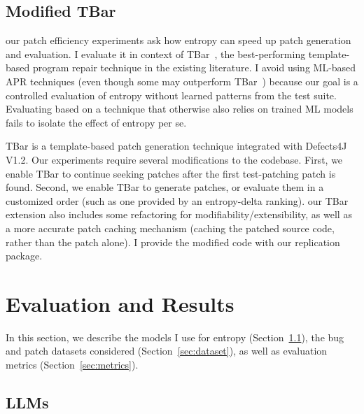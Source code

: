 \documentclass[12pt,openany,oneside,table]{cmuthesis}
\begin{document}
\subsection{Modified TBar}
\label{sec:entropy-tbar}

our patch efficiency experiments ask how entropy can speed up patch generation
and evaluation.  I evaluate it in context of TBar~\cite{TBar}, the best-performing
template-based program repair technique in the existing literature.  I avoid
using ML-based APR techniques (even though some may outperform TBar~\cite{xia2023automated, TransferFL, Dear}) because our goal is a controlled evaluation of entropy without learned patterns from the test suite.  Evaluating based on a technique that otherwise also relies on trained ML
models fails to isolate the effect of entropy per se.

TBar is a template-based patch generation technique
integrated with Defects4J V1.2. Our experiments require several modifications to the
codebase.  First, we enable TBar to continue seeking patches after the first
test-patching patch is found.  Second, we enable TBar to generate patches, or
evaluate them in a customized order (such as one provided by an entropy-delta ranking).
our TBar extension also includes some refactoring for
modifiability/extensibility, as well as a more accurate patch caching mechanism
(caching the patched source code, rather than the patch alone).  I provide the
modified code with our replication package.


\section{Evaluation and Results}

In this section, we describe the models I use for entropy
(Section~\ref{sec:llms}), the bug and patch datasets considered
(Section~\ref{sec:dataset}), as well as evaluation metrics (Section~\ref{sec:metrics}).

\subsection{LLMs}
\label{sec:llms}
\end{document}
